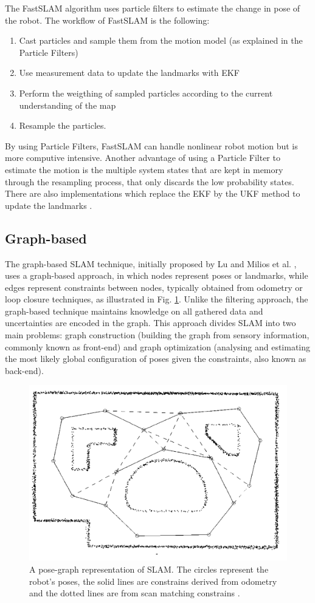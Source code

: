 The FastSLAM algorithm \cite{thrun_fastslam_nodate} uses particle filters to estimate the change in pose of the robot. The workflow of FastSLAM is the following:
\begin{enumerate}
    \item Cast particles and sample them from the motion model (as explained in the Particle Filters)
    \item Use measurement data to update the landmarks with \acs*{EKF}
    \item Perform the weigthing of sampled particles according to the current understanding of the map 
    \item Resample the particles.
\end{enumerate}
By using Particle Filters, FastSLAM can handle nonlinear robot motion but is more computive intensive. Another advantage of using a Particle Filter to estimate the motion is the multiple system states that are kept in memory through the resampling process, that only discards the low probability states. There are also implementations which replace the \acs*{EKF} by the \acs*{UKF} method to update the landmarks \cite{wang_upf-ukf_2007}.


\subsection{Graph-based}

The graph-based \acs*{SLAM} technique, initially proposed by Lu and Milios et al. \cite{lu_globally_1997}, uses a graph-based approach, in which nodes represent poses or landmarks, while edges represent constraints between nodes, typically obtained from odometry or loop closure techniques, as illustrated in Fig. \ref*{fig: graph SLAM}. Unlike the filtering approach, the graph-based technique maintains knowledge on all gathered data and uncertainties are encoded in the graph. This approach divides \acs*{SLAM} into two main problems: graph construction (building the graph from sensory information, commonly known as front-end) and graph optimization (analysing and estimating the most likely global configuration of poses given the constraints, also known as back-end).

\begin{figure}[H]
    \centering
    \includegraphics[width=0.7\linewidth]{images/background/graph_SLAM.png}
    \caption{A pose-graph representation of \acs*{SLAM}. The circles represent the robot's poses, the solid lines are constrains derived from odometry and the dotted lines are from scan matching constrains \cite{lu_globally_1997}.}
    \label{fig: graph SLAM}
\end{figure}


